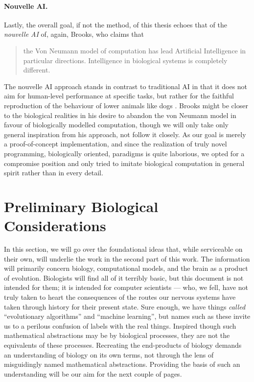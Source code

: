 \paragraph{Nouvelle AI.} Lastly, the overall goal, if not the method, of this thesis echoes that of the {\em nouvelle AI} of, again, Brooks, who claims that
\begin{quotation}
	the Von Neumann model of computation has lead Artificial Intelligence in particular directions. Intelligence in biological systems is completely different. \cite{Brooks91intelligencewithout}
\end{quotation}
The nouvelle AI approach stands in contrast to traditional AI in that it does not aim for human-level performance at specific tasks, but rather for the faithful reproduction of the behaviour of lower animals like dogs \cite{nouvelleAI}. Brooks might be closer to the biological realities in his desire to abandon the von Neumann model in favour of biologically modelled computation, though we will only take only general inspiration from his approach, not follow it closely. As our goal is merely a proof-of-concept implementation, and since the realization of truly novel programming, biologically oriented, paradigms is quite laborious, we opted for a compromise position and only tried to imitate biological computation in general spirit rather than in every detail.

\section{Preliminary Biological Considerations}\label{sec:preliminaryBiologicalConsiderations}

In this section, we will go over the foundational ideas that, while serviceable on their own, will underlie the work in the second part of this work. The information will primarily concern biology, computational models, and the brain as a product of evolution. Biologists will find all of it terribly basic, but this document is not intended for them; it is intended for computer scientists --- who, we fell, have not truly taken to heart the consequences of the routes our nervous systems have taken through history for their present state. Sure enough, we have things {\em called} ``evolutionary algorithms'' and ``machine learning'', but names such as these invite us to a perilous confusion of labels with the real things. Inspired though such mathematical abstractions may be by biological processes, they are not the equivalents of these processes. Recreating the end-products of biology demands an understanding of biology on its own terms, not through the lens of misguidingly named mathematical abstractions. Providing the basis of such an understanding will be our aim for the next couple of pages.

